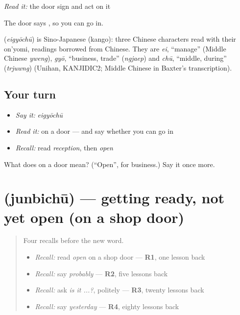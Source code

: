 \emph{Read it:} the door sign and act on it

The door says \textbf{}, so you can go in.

\begin{cousinweb}
\textbf{} (\emph{eigyōchū}) is Sino-Japanese (kango): three Chinese characters read with their on'yomi, readings borrowed from Chinese. They are \emph{ei}, \textquotedblleft{}manage\textquotedblright{} (Middle Chinese \emph{yweng}), \emph{gyō}, \textquotedblleft{}business, trade\textquotedblright{} (\emph{ngjaep}) and \emph{chū}, \textquotedblleft{}middle, during\textquotedblright{} (\emph{trjuwng}) (Unihan, KANJIDIC2; Middle Chinese in Baxter's transcription).
\end{cousinweb}

\subsection*{Your turn}
\begin{itemize}
\raggedright
  \item \emph{Say it:} \emph{eigyōchū}
  \item \emph{Read it:} \textbf{} on a door — and say whether you can go in
  \item \emph{Recall:} read \emph{reception}, then \emph{open}
\end{itemize}

\begin{tcolorbox}[breakable,colback=teal!4,colframe=teal!35!black,title={Before you move on}]
What does  on a door mean? (\textquotedblleft{}Open\textquotedblright{}, for business.) Say it once more.
\end{tcolorbox}
\section[\texorpdfstring{\ja{じゅんびちゅう} (junbichū)}{じゅんびちゅう (junbichū)}]{ (junbichū) — getting ready, not yet open (on a shop door)}

\label{lesson:JA-C142-junbichuu}



\begin{quote}
Four recalls before the new word.

\begin{itemize}
\raggedright
  \item \emph{Recall:} read \emph{open} on a shop door — \textbf{R1}, one lesson back
  \item \emph{Recall:} say \emph{probably} — \textbf{R2}, five lessons back
  \item \emph{Recall:} ask \emph{is it ...?}, politely — \textbf{R3}, twenty lessons back
  \item \emph{Recall:} say \emph{yesterday} — \textbf{R4}, eighty lessons back
\end{itemize}
\end{quote}

